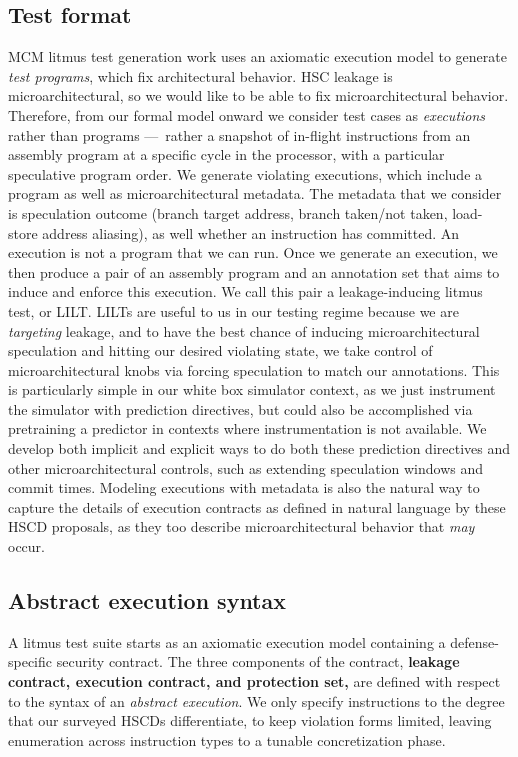 \subsection{Test format}
MCM litmus test generation work uses an axiomatic execution model to generate \textit{test programs}, which fix architectural behavior. HSC leakage is microarchitectural, so we would like to be able to fix microarchitectural behavior. Therefore, from our formal model onward we consider test cases as \textit{executions} rather than programs — rather a snapshot of in-flight instructions from an assembly program at a specific cycle in the processor, with a particular speculative program order. We generate violating executions, which include a program as well as microarchitectural metadata. The metadata that we consider is speculation outcome (branch target address, branch taken/not taken, load-store address aliasing), as well whether an instruction has committed. An execution is not a program that we can run. Once we generate an execution, we then produce a pair of an assembly program and an annotation set that aims to induce and enforce this execution. We call this pair a leakage-inducing litmus test, or LILT. LILTs are useful to us in our testing regime because we are \textit{targeting} leakage, and to have the best chance of inducing microarchitectural speculation and hitting our desired violating state, we take control of microarchitectural knobs via forcing speculation to match our annotations. This is particularly simple in our white box simulator context, as we just instrument the simulator with prediction directives, but could also be accomplished via pretraining a predictor in contexts where instrumentation is not available. We develop both implicit and explicit ways to do both these prediction directives and other microarchitectural controls, such as extending speculation windows and commit times. Modeling executions with metadata is also the natural way to capture the details of execution contracts as defined in natural language by these HSCD proposals, as they too describe microarchitectural behavior that \textit{may} occur.

\subsection{Abstract execution syntax}
A \toolname{} litmus test suite starts as an axiomatic execution model containing a defense-specific security contract. The three components of the contract, \textbf{leakage contract, execution contract, and protection set,} are defined with respect to the syntax of an \textit{abstract execution}. We only specify instructions to the degree that our surveyed HSCDs differentiate, to keep violation forms limited, leaving enumeration across instruction types to a tunable concretization phase. 

